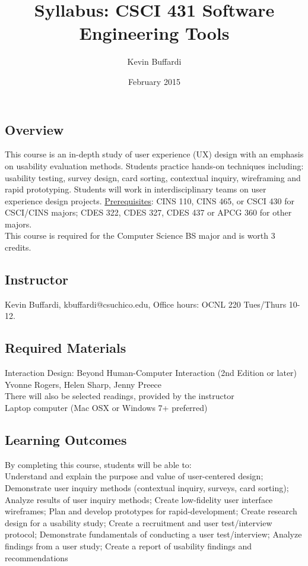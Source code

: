 \documentclass[12pt]{article}
\title{Syllabus: CSCI 431 Software Engineering Tools}
\author{Kevin Buffardi}
\date{February 2015}
\begin{document}
  \maketitle
  \subsection*{Overview}	 
  \noindent
  This course is an in-depth study of user experience (UX) design with an emphasis on usability evaluation methods. Students practice hands-on techniques including: usability testing, survey design, card sorting, contextual inquiry, wireframing and rapid prototyping. Students will work in interdisciplinary teams on user experience design projects.
  \newline
  \underline{Prerequisites}: CINS 110, CINS 465, or CSCI 430 for CSCI/CINS majors; CDES 322, CDES 327, CDES 437 or APCG 360 for other majors. \\
  This course is required for the Computer Science BS major and is worth 3 credits. 
  
  \subsection*{Instructor}
  \noindent
  Kevin Buffardi, kbuffardi@csuchico.edu, Office hours: OCNL 220 Tues/Thurs 10-12. \\

  \subsection*{Required Materials}
  \noindent
  Interaction Design: Beyond Human-Computer Interaction (2nd Edition or later) \\
  Yvonne Rogers, Helen Sharp, Jenny Preece \\
  There will also be selected readings, provided by the instructor \\
  \newline
  Laptop computer (Mac OSX or Windows 7+ preferred)

  \subsection*{Learning Outcomes}
  \noindent
  By completing this course, students will be able to: \\
    Understand and explain the purpose and value of user-centered design; Demonstrate user inquiry methods (contextual inquiry, surveys, card sorting); Analyze results of user inquiry methods; Create low-fidelity user interface wireframes; Plan and develop prototypes for rapid-development; Create research design for a usability study; Create a recruitment and user test/interview protocol; Demonstrate fundamentals of conducting a user test/interview; Analyze findings from a user study; Create a report of usability findings and recommendations \\
\end{document}
